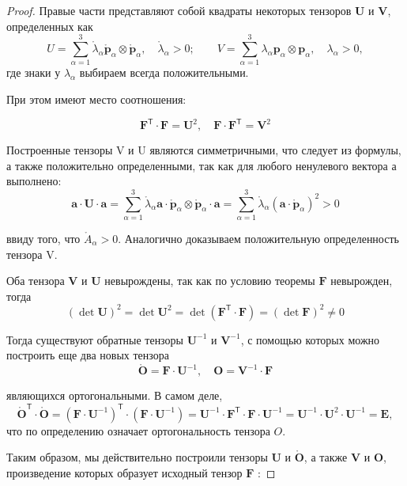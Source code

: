 \begin{proof}
Правые части представляют собой квадраты некоторых тензоров $\mathbf{U}$ и
$\mathbf{V}$, определенных как 
\[
  U = \sum_{\alpha=1}^3 \mathring{\lambda}_\alpha
  \mathring{\mathbf{p}}_\alpha\otimes \mathring{\mathbf{p}}_\alpha, \quad
  \mathring{\lambda}_\alpha > 0; \qquad V = \sum_{\alpha = 1}^3
  \lambda_\alpha\mathbf{p}_\alpha \otimes \mathbf{p}_\alpha, \quad
  \lambda_\alpha > 0,
\]
где знаки у $\lambda_{\alpha}$ выбираем всегда положительными.

При этом имеют место соотношения:

\[
\mathbf{F}^{\mathsf{T}} \cdot \mathbf{F}=\mathbf{U}^{2}, \quad \mathbf{F} \cdot \mathbf{F}^{\mathsf{T}}=\mathbf{V}^{2}
\]

Построенные тензоры V и U являются симметричными, что следует из формулы, а также положительно определенными, так как для любого ненулевого вектора а выполнено:
\[
\mathbf{a} \cdot \mathbf{U} \cdot \mathbf{a}=\sum_{\alpha=1}^{3} \mathring{\lambda}_{\alpha} \mathbf{a} \cdot \mathring{\mathbf{p}}_{\alpha} \otimes \mathring{\mathbf{p}}_{\alpha} \cdot \mathbf{a}=\sum_{\alpha=1}^{3} \mathring{\lambda}_{\alpha}\left(\mathbf{a} \cdot \mathring{\mathbf{p}}_{\alpha}\right)^{2}>0
\]

ввиду того, что $\mathring{A}_{\alpha}>0$. Аналогично доказываем положительную определенность тензора V.

Оба тензора $ \mathbf{V} $ и $\mathbf{U}$ невырождены, так как по условию
теоремы $\mathbf{F}$ невырожден, тогда
\[
(\operatorname{det} \mathbf{U})^{2}=\operatorname{det} \mathbf{U}^{2}=\operatorname{det}\left(\mathbf{F}^{\mathsf{T}} \cdot \mathbf{F}\right)=(\operatorname{det} \mathbf{F})^{2} \neq 0
\]

Тогда существуют обратные тензоры $\mathbf{U}^{-1}$ и $\mathbf{V}^{-1}$, с помощью которых можно построить еще два новых тензора
\[
\mathring{\mathbf{O}}=\mathbf{F} \cdot \mathbf{U}^{-1}, \quad \mathbf{O}=\mathbf{V}^{-1} \cdot \mathbf{F}
\]

являющихся ортогональными. В самом деле,
\[
\mathring{\mathbf{O}}^{\mathsf{T}} \cdot \mathring{\mathbf{O}}=\left(\mathbf{F}
\cdot \mathbf{U}^{-1}\right)^{\mathsf{T}} \cdot\left(\mathbf{F} \cdot
\mathbf{U}^{-1}\right)=\mathbf{U}^{-1} \cdot \mathbf{F}^{\mathsf{T}} \cdot
\mathbf{F} \cdot \mathbf{U}^{-1}=\mathbf{U}^{-1} \cdot \mathbf{U}^{2} \cdot
\mathbf{U}^{-1}=\mathbf{E},
\]
что по определению означает ортогональность тензора $ O $.

Таким образом, мы действительно построили тензоры $\mathbf{U}$ и $\mathring{\mathbf{O}}$, а также $\mathbf{V}$ и $\mathbf{O}$, произведение которых образует исходный тензор $\mathbf{F}$ :


\end{proof}

